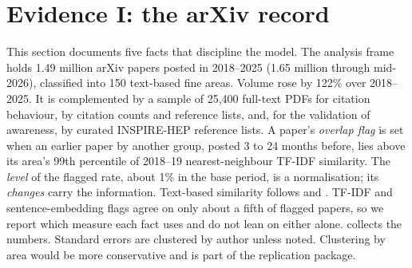 \section{Evidence I: the arXiv record}\label{sec:facts}

This section documents five facts that discipline the model. The analysis frame
holds 1.49 million arXiv papers posted in 2018--2025 (1.65 million through
mid-2026), classified into 150 text-based fine areas. Volume rose by 122\% over
2018--2025. It is complemented by a sample of 25,400 full-text PDFs for citation
behaviour, by citation counts and reference lists, and, for the validation of
awareness, by curated INSPIRE-HEP reference lists. A paper's \emph{overlap
flag} is set when an earlier paper by another group, posted 3 to 24 months
before, lies above its area's 99th percentile of 2018--19 nearest-neighbour
TF-IDF similarity. The \emph{level} of the flagged rate, about 1\% in the base
period, is a normalisation; its \emph{changes} carry the information.
Text-based similarity follows \citet{hobergphillips2016} and
\citet{kellyetal2021}. TF-IDF and sentence-embedding flags agree on only about
a fifth of flagged papers, so we report which measure each fact uses and do not
lean on either alone.  collects the numbers. Standard errors are
clustered by author unless noted. Clustering by area would be more conservative
and is part of the replication package.

